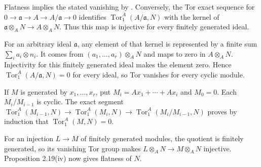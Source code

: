 Flatness implies the stated vanishing by . Conversely, the Tor exact sequence for $0\to\mathfrak{a}\to A\to A/\mathfrak{a}\to0$ identifies $\operatorname{Tor}_1^A(A/\mathfrak{a},N)$ with the kernel of $\mathfrak{a}\otimes_A N\to A\otimes_A N$. Thus this map is injective for every finitely generated ideal.

For an arbitrary ideal $\mathfrak{a}$, any element of that kernel is represented by a finite sum $\sum_i a_i\otimes n_i$. It comes from $(a_1,\ldots,a_r)\otimes_A N$ and maps to zero in $A\otimes_A N$. Injectivity for this finitely generated ideal makes the element zero. Hence $\operatorname{Tor}_1^A(A/\mathfrak{a},N)=0$ for every ideal, so Tor vanishes for every cyclic module.

If $M$ is generated by $x_1,\ldots,x_r$, put $M_i=Ax_1+\cdots+Ax_i$ and $M_0=0$. Each $M_i/M_{i-1}$ is cyclic. The exact segment $\operatorname{Tor}_1^A(M_{i-1},N)\to\operatorname{Tor}_1^A(M_i,N)\to\operatorname{Tor}_1^A(M_i/M_{i-1},N)$ proves by induction that $\operatorname{Tor}_1^A(M,N)=0$.

For an injection $L\to M$ of finitely generated modules, the quotient is finitely generated, so its vanishing Tor group makes $L\otimes_A N\to M\otimes_A N$ injective. Proposition 2.19(iv) now gives flatness of $N$.
